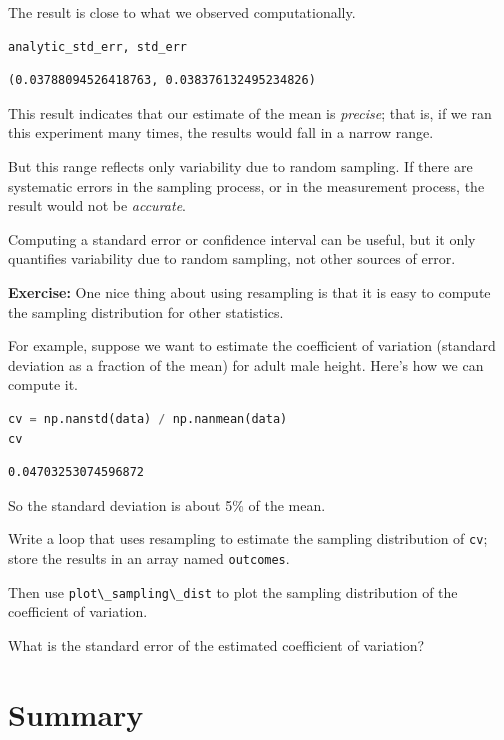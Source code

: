The result is close to what we observed computationally.

\begin{lstlisting}[language=Python]
analytic_std_err, std_err
\end{lstlisting}

\begin{lstlisting}[]
(0.03788094526418763, 0.038376132495234826)
\end{lstlisting}

This result indicates that our estimate of the mean is \emph{precise};
that is, if we ran this experiment many times, the results would fall in
a narrow range.

But this range reflects only variability due to random sampling. If
there are systematic errors in the sampling process, or in the
measurement process, the result would not be \emph{accurate}.

Computing a standard error or confidence interval can be useful, but it
only quantifies variability due to random sampling, not other sources of
error.

\textbf{Exercise:} One nice thing about using resampling is that it is
easy to compute the sampling distribution for other statistics.

For example, suppose we want to estimate the coefficient of variation
(standard deviation as a fraction of the mean) for adult male height.
Here's how we can compute it.

\begin{lstlisting}[language=Python]
cv = np.nanstd(data) / np.nanmean(data)
cv
\end{lstlisting}

\begin{lstlisting}[]
0.04703253074596872
\end{lstlisting}

So the standard deviation is about 5\% of the mean.

Write a loop that uses resampling to estimate the sampling distribution
of \passthrough{\lstinline!cv!}; store the results in an array named
\passthrough{\lstinline!outcomes!}.

Then use \passthrough{\lstinline!plot\_sampling\_dist!} to plot the
sampling distribution of the coefficient of variation.

What is the standard error of the estimated coefficient of variation?

\hypertarget{summary}{%
\section{Summary}\label{summary}}

